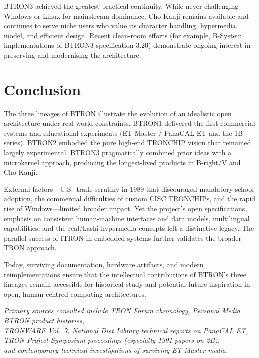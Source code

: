 \documentclass{article}
\begin{document}
BTRON3 achieved the greatest practical continuity. While never challenging Windows or Linux for mainstream dominance, Cho-Kanji remains available and continues to serve niche users who value its character handling, hypermedia model, and efficient design. Recent clean-room efforts (for example, B-System implementations of BTRON3 specification 3.20) demonstrate ongoing interest in preserving and modernising the architecture.

\section{Conclusion}

The three lineages of BTRON illustrate the evolution of an idealistic open architecture under real-world constraints. BTRON1 delivered the first commercial systems and educational experiments (ET Master / PanaCAL ET and the 1B series). BTRON2 embodied the pure high-end TRONCHIP vision that remained largely experimental. BTRON3 pragmatically combined prior ideas with a microkernel approach, producing the longest-lived products in B-right/V and Cho-Kanji.

External factors---U.S.\ trade scrutiny in 1989 that discouraged mandatory school adoption, the commercial difficulties of custom CISC TRONCHIPs, and the rapid rise of Windows---limited broader impact. Yet the project's open specifications, emphasis on consistent human-machine interfaces and data models, multilingual capabilities, and the real/kashi hypermedia concepts left a distinctive legacy. The parallel success of ITRON in embedded systems further validates the broader TRON approach.

Today, surviving documentation, hardware artifacts, and modern reimplementations ensure that the intellectual contributions of BTRON's three lineages remain accessible for historical study and potential future inspiration in open, human-centred computing architectures.

\vspace{1.5cm}
\begin{center}
\textit{Primary sources consulted include TRON Forum chronology, Personal Media BTRON product histories,}\\
\textit{TRONWARE Vol.~7, National Diet Library technical reports on PanaCAL ET,}\\
\textit{TRON Project Symposium proceedings (especially 1991 papers on 2B),}\\
\textit{and contemporary technical investigations of surviving ET Master media.}
\end{center}
\end{document}

